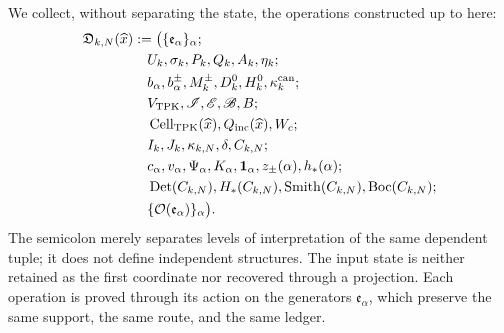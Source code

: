 We collect, without separating the state, the operations constructed up to here:
\begin{equation}
\label{eq:pdfv2-cor-constructor-unico}
 \begin{aligned}
 \mathfrak D_{k,N}(\widehat x)
 &:=\bigl(\{\mathfrak e_\alpha\}_\alpha;\\
 &\quad U_k,\sigma_k,P_k,Q_k,A_k,\eta_k;\\
 &\quad b_\alpha,b_\alpha^\pm,M_k^\pm,D_k^0,H_k^0,
 \kappa_k^{\rm can};\\
 &\quad V_{\rm TPK},\mathscr I,\mathscr E,\mathscr B,B;\\
 &\quad \operatorname{Cell}_{\rm TPK}(\widehat x),Q_{\rm inc}(\widehat x),W_c;\\
 &\quad I_k,J_k,\kappa_{k,N},\delta,C_{k,N};\\
 &\quad c_\alpha,v_\alpha,\Psi_\alpha,K_\alpha,
 \mathbf1_\alpha,z_\pm(\alpha),h_*(\alpha);\\
 &\quad
 \operatorname{Det}(C_{k,N}),H_*(C_{k,N}),
 \operatorname{Smith}(C_{k,N}),\operatorname{Boc}(C_{k,N});\\
 &\quad \{\mathcal O(\mathfrak e_\alpha)\}_\alpha
 \bigr).
 \end{aligned}
\end{equation}
The semicolon merely separates levels of interpretation of the same dependent tuple; it does not define independent structures. The input state is neither retained as the first coordinate nor recovered through a projection. Each operation is proved through its action on the generators \(\mathfrak e_\alpha\), which preserve the same support, the same route, and the same ledger.

